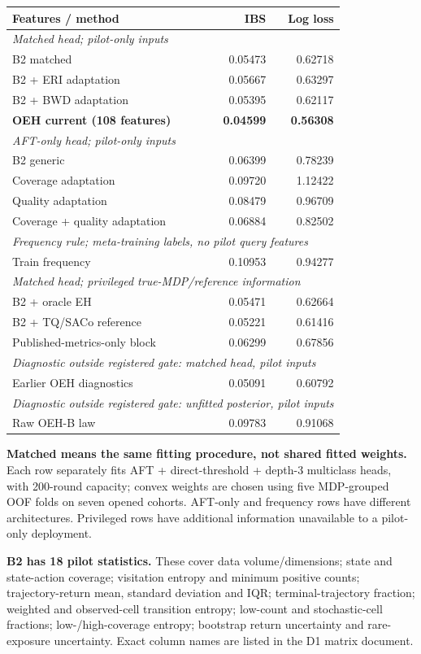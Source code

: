 \documentclass[10pt,a4paper]{article}
\newcommand{\block}[1]{\multicolumn{3}{l}{\small\textit{#1}}\\}
\begin{document}
{\small\centering
\begin{tabular}{@{}p{}rr@{}}\hline
\textbf{Features / method} & \textbf{IBS} & \textbf{Log loss}\\\hline
\block{Matched head; pilot-only inputs}
B2 matched & 0.05473 & 0.62718\\
B2 + ERI adaptation & 0.05667 & 0.63297\\
B2 + BWD adaptation & 0.05395 & 0.62117\\
\textbf{OEH current (108 features)} & \textbf{0.04599} & \textbf{0.56308}\\\hline
\block{AFT-only head; pilot-only inputs}
B2 generic & 0.06399 & 0.78239\\
Coverage adaptation & 0.09720 & 1.12422\\
Quality adaptation & 0.08479 & 0.96709\\
Coverage + quality adaptation & 0.06884 & 0.82502\\\hline
\block{Frequency rule; meta-training labels, no pilot query features}
Train frequency & 0.10953 & 0.94277\\\hline
\block{Matched head; privileged true-MDP/reference information}
B2 + oracle EH & 0.05471 & 0.62664\\
B2 + TQ/SACo reference & 0.05221 & 0.61416\\
Published-metrics-only block & 0.06299 & 0.67856\\\hline
\block{Diagnostic outside registered gate: matched head, pilot inputs}
Earlier OEH diagnostics & 0.05091 & 0.60792\\\hline
\block{Diagnostic outside registered gate: unfitted posterior, pilot inputs}
Raw OEH-B law & 0.09783 & 0.91068\\\hline
\end{tabular}\par}

\textbf{Matched means the same fitting procedure, not shared fitted weights.} Each row separately fits AFT + direct-threshold + depth-3 multiclass heads, with 200-round capacity; convex weights are chosen using five MDP-grouped OOF folds on seven opened cohorts. AFT-only and frequency rows have different architectures. Privileged rows have additional information unavailable to a pilot-only deployment.

\textbf{B2 has 18 pilot statistics.} These cover data volume/dimensions; state and state-action coverage; visitation entropy and minimum positive counts; trajectory-return mean, standard deviation and IQR; terminal-trajectory fraction; weighted and observed-cell transition entropy; low-count and stochastic-cell fractions; low-/high-coverage entropy; bootstrap return uncertainty and rare-exposure uncertainty. Exact column names are listed in the D1 matrix document.
\end{document}
